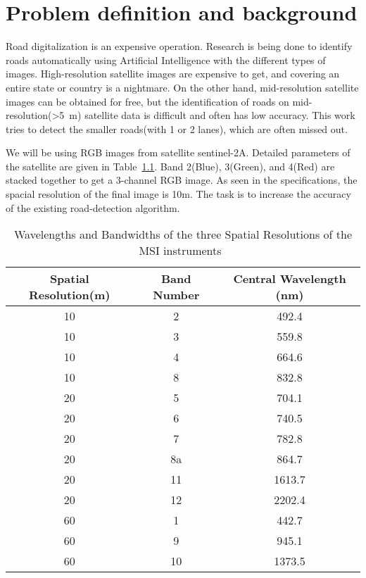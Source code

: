 \chapter{Problem definition and background}\label{chapt:problem}
Road digitalization is an expensive operation. Research is being done to identify roads automatically using Artificial Intelligence with the different types of images. High-resolution satellite images are expensive to get, and covering an entire state or country is a nightmare. On the other hand, mid-resolution satellite images can be obtained for free, but the identification of roads on mid-resolution(>5~m) satellite data is difficult and often has low accuracy. This work tries to detect the smaller roads(with 1 or 2 lanes), which are often missed out.

We will be using RGB images from satellite sentinel-2A. Detailed parameters of the satellite are given in Table~\ref{tab:sentinel-resolution}. Band 2(Blue), 3(Green), and 4(Red) are stacked together to get a 3-channel RGB image. As seen in the specifications, the spacial resolution of the final image is 10m. The task is to increase the accuracy of the existing road-detection algorithm.

\begin{table}[h!]
  \centering
  \begin{tabular}{ |c|c|c| }
    \hline
    Spatial Resolution(m) & Band Number & Central Wavelength (nm) \\
    \hline
    10&2&492.4 \\
    10&3&559.8 \\
    10&4&664.6 \\
    10&8&832.8 \\
    20&5&704.1 \\
    20&6&740.5 \\
    20&7&782.8 \\
    20&8a&864.7 \\
    20&11&1613.7 \\
    20&12&2202.4 \\
    60&1&442.7 \\
    60&9&945.1 \\
    60&10&1373.5 \\
    \hline
  \end{tabular}
  \caption{Wavelengths and Bandwidths of the three Spatial Resolutions of the MSI instruments~\cite{sentinelSpecifications}}
  \label{tab:sentinel-resolution}
\end{table}

